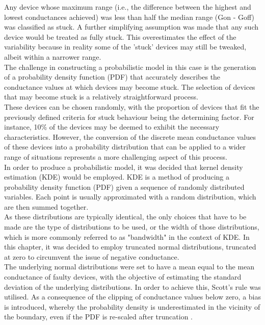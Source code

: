 \noindent Any device whose maximum range (i.e., the difference between the highest and lowest conductances achieved) was less than half the median range (Gon - Goff) was classified as stuck. A further simplifying assumption was made that any such device would be treated as fully stuck. This overestimates the effect of the variability because in reality some of the 'stuck' devices may still be tweaked, albeit within a narrower range.\\

\noindent The challenge in constructing a probabilistic model in this case is the generation of a probability density function (PDF) that accurately describes the conductance values at which devices may become stuck. The selection of devices that may become stuck is a relatively straightforward process. \\

\noindent These devices can be chosen randomly, with the proportion of devices that fit the previously defined criteria for stuck behaviour being the determining factor. For instance, 10\% of the devices may be deemed to exhibit the necessary characteristics. However, the conversion of the discrete mean conductance values of these devices into a probability distribution that can be applied to a wider range of situations represents a more challenging aspect of this process.\\

\noindent In order to produce a probabilistic model, it was decided that kernel density estimation (KDE) would be employed. KDE is a method of producing a probability density function (PDF) given a sequence of randomly distributed variables. Each point is usually approximated with a random distribution, which are then summed together. \\

\noindent As these distributions are typically identical, the only choices that have to be made are the type of distributions to be used, or the width of those distributions, which is more commonly referred to as "bandwidth" \cite{turlach1993bandwidth} in the context of KDE. In this chapter, it was decided to employ truncated normal distributions, truncated at zero to circumvent the issue of negative conductance. \\

\noindent The underlying normal distributions were set to have a mean equal to the mean conductance of faulty devices, with the objective of estimating the standard deviation of the underlying distributions. In order to achieve this, Scott's rule \cite{scott2015multivariate} was utilised. As a consequence of the clipping of conductance values below zero, a bias is introduced, whereby the probability density is underestimated in the vicinity of the boundary, even if the PDF is re-scaled after truncation \cite{silverman2018density}. \\

